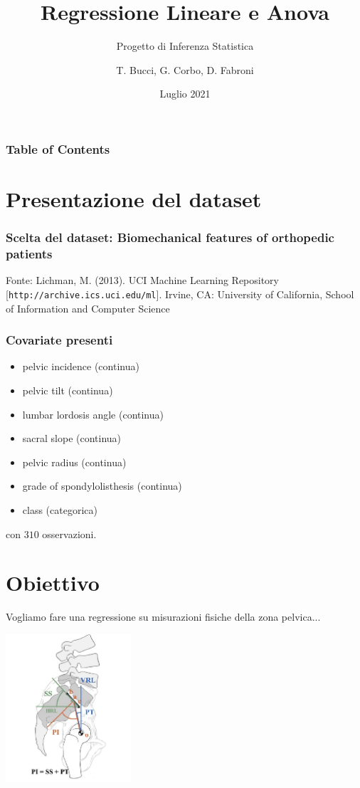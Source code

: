 \documentclass{beamer}
\title{Regressione Lineare e Anova}
\subtitle{Progetto di Inferenza Statistica}
\author{T. Bucci, G. Corbo, D. Fabroni}
\institute{Politecnico di Milano}
\date{Luglio 2021}
\begin{document}
\frame{\titlepage}

\begin{frame}
    \frametitle{Table of Contents}
    \tableofcontents
\end{frame}

\section{Presentazione del dataset}
\begin{frame}
    \frametitle{Scelta del dataset: Biomechanical features of orthopedic patients}
    Fonte: Lichman, M. (2013). UCI Machine Learning Repository [\texttt{http://archive.ics.uci.edu/ml}]. Irvine, CA: University of California, School of Information and Computer Science
\end{frame}


\begin{frame}
    \frametitle{Covariate presenti}
    \begin{itemize}
        \item pelvic incidence (continua)
        \item pelvic tilt (continua)
        \item lumbar lordosis angle (continua)
        \item sacral slope (continua)
        \item pelvic radius (continua)
        \item grade of spondylolisthesis (continua)
        \item class (categorica)
    \end{itemize}
    con $310$ osservazioni.
\end{frame}


\section{Obiettivo}
\begin{frame}
    Vogliamo fare una regressione su misurazioni fisiche della zona pelvica...
    \begin{center}
        \includegraphics[width=0.35\textwidth]{bacino.png}
    \end{center}
\end{frame}
\end{document}

